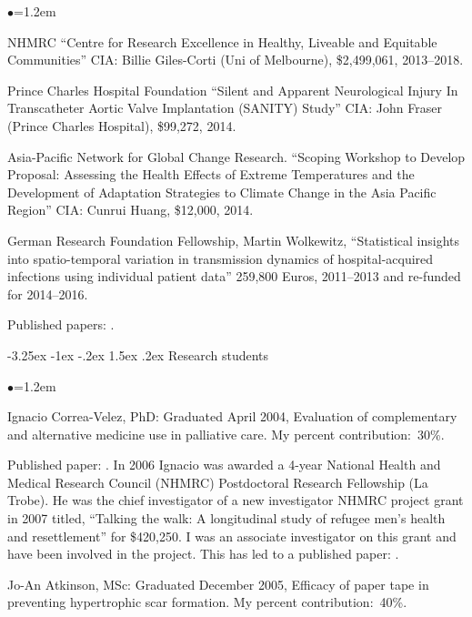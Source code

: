\documentclass[a4paper,11pt]{article}
\makeatletter
\renewcommand\subsection{\@startsection{subsection}{2}{\z@}%
                                       {-3.25ex \@plus -1ex \@minus -.2ex}%
                                       {1.5ex \@plus .2ex}%
                                   {\normalfont\normalsize\bfseries\color{blue}}}
\renewcommand{\labelitemi}{$\bullet$}
\makeatother
\begin{document}
\begin{raggedright}
\begin{list}{\labelitemi}{\leftmargin=1.2em}
\item NHMRC ``Centre for Research Excellence in Healthy, Liveable and Equitable Communities'' CIA: Billie Giles-Corti (Uni of Melbourne), \$2,499,061, 2013--2018.

\item Prince Charles Hospital Foundation ``Silent and Apparent Neurological Injury In Transcatheter Aortic Valve Implantation (SANITY) Study'' CIA: John Fraser (Prince Charles Hospital), \$99,272, 2014.

\item Asia-Pacific Network for Global Change Research. ``Scoping Workshop to Develop Proposal: Assessing the Health Effects of Extreme Temperatures and the Development of Adaptation Strategies to Climate Change in the Asia Pacific Region'' CIA: Cunrui Huang, \$12,000, 2014.

\item German Research Foundation Fellowship, Martin Wolkewitz, ``Statistical insights into spatio-temporal variation in transmission dynamics of hospital-acquired infections using individual patient data'' 259,800
Euros, 2011--2013 and re-funded for 2014--2016.

    Published papers: .


\end{list}

\subsection{Research students}

\begin{list}{\labelitemi}{\leftmargin=1.2em}\addtolength{\itemsep}{-0.5\baselineskip}
\item Ignacio Correa-Velez, PhD: Graduated April 2004, Evaluation of complementary and alternative medicine use in palliative care. My percent contribution:~30\%.

Published paper: . In 2006 Ignacio was awarded a 4-year National Health and Medical Research Council (NHMRC) Postdoctoral Research Fellowship (La Trobe). He was the chief investigator of a new investigator NHMRC project grant in 2007 titled, ``Talking the walk: A longitudinal study of refugee men's health and resettlement'' for \$420,250. I was an associate investigator on this grant and have been involved in the project. This has led to a published paper: .

\item Jo-An Atkinson, MSc: Graduated December 2005, Efficacy of paper tape in preventing hypertrophic scar formation. My percent contribution:~40\%.


\end{list}
\end{raggedright}
\end{document}
